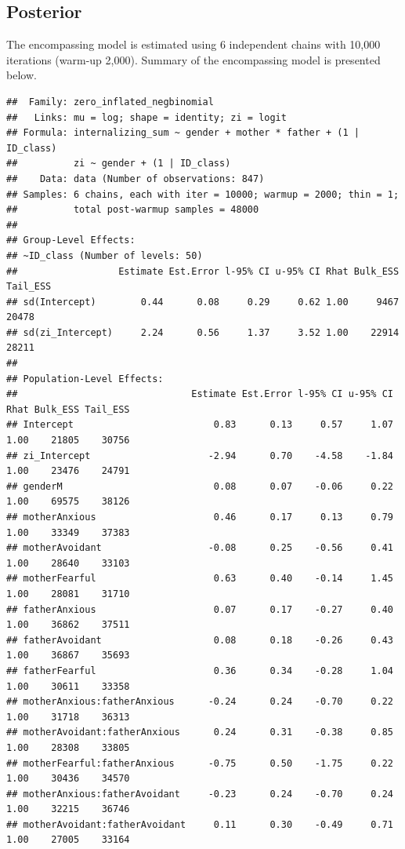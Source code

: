 \documentclass[
]{book}
\begin{document}
\hypertarget{posterior-1}{%
\subsection{Posterior}\label{posterior-1}}

The encompassing model is estimated using 6 independent chains with 10,000 iterations (warm-up 2,000). Summary of the encompassing model is presented below.

\begin{verbatim}
##  Family: zero_inflated_negbinomial 
##   Links: mu = log; shape = identity; zi = logit 
## Formula: internalizing_sum ~ gender + mother * father + (1 | ID_class) 
##          zi ~ gender + (1 | ID_class)
##    Data: data (Number of observations: 847) 
## Samples: 6 chains, each with iter = 10000; warmup = 2000; thin = 1;
##          total post-warmup samples = 48000
## 
## Group-Level Effects: 
## ~ID_class (Number of levels: 50) 
##                  Estimate Est.Error l-95% CI u-95% CI Rhat Bulk_ESS Tail_ESS
## sd(Intercept)        0.44      0.08     0.29     0.62 1.00     9467    20478
## sd(zi_Intercept)     2.24      0.56     1.37     3.52 1.00    22914    28211
## 
## Population-Level Effects: 
##                               Estimate Est.Error l-95% CI u-95% CI Rhat Bulk_ESS Tail_ESS
## Intercept                         0.83      0.13     0.57     1.07 1.00    21805    30756
## zi_Intercept                     -2.94      0.70    -4.58    -1.84 1.00    23476    24791
## genderM                           0.08      0.07    -0.06     0.22 1.00    69575    38126
## motherAnxious                     0.46      0.17     0.13     0.79 1.00    33349    37383
## motherAvoidant                   -0.08      0.25    -0.56     0.41 1.00    28640    33103
## motherFearful                     0.63      0.40    -0.14     1.45 1.00    28081    31710
## fatherAnxious                     0.07      0.17    -0.27     0.40 1.00    36862    37511
## fatherAvoidant                    0.08      0.18    -0.26     0.43 1.00    36867    35693
## fatherFearful                     0.36      0.34    -0.28     1.04 1.00    30611    33358
## motherAnxious:fatherAnxious      -0.24      0.24    -0.70     0.22 1.00    31718    36313
## motherAvoidant:fatherAnxious      0.24      0.31    -0.38     0.85 1.00    28308    33805
## motherFearful:fatherAnxious      -0.75      0.50    -1.75     0.22 1.00    30436    34570
## motherAnxious:fatherAvoidant     -0.23      0.24    -0.70     0.24 1.00    32215    36746
## motherAvoidant:fatherAvoidant     0.11      0.30    -0.49     0.71 1.00    27005    33164

\end{verbatim}
\end{document}
